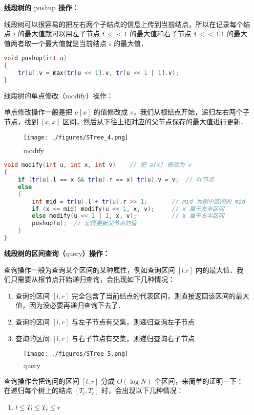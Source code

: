 \textbf{线段树的 $\text{pushup}$ 操作：}

线段树可以很容易的把左右两个子结点的信息上传到当前结点，所以在记录每个结点 $i$ 的最大值就可以用左子节点 $\mathtt{i<<1}$ 的最大值和右子节点 $\mathtt{i<<1|1}$ 的最大值两者取一个最大值就是当前结点 $i$ 的最大值．

\begin{lstlisting}[language=cpp]
void pushup(int u)
{
    tr[u].v = max(tr[u << 1].v, tr[u << 1 | 1].v);
}
\end{lstlisting}

线段树的单点修改（$\text{modify}$）操作：

单点修改操作一般是把 $a[x]$ 的值修改成 $v$，我们从根结点开始，递归左右两个子节点，找到 $[x, x]$ 区间，然后从下往上把对应的父节点保存的最大值进行更新．

\begin{figure}[ht]
\centering
\texttt{[image: ./figures/STree\_4.png]}
\caption{$\text{modify}$} \label{STree_fig4}
\end{figure}


\begin{lstlisting}[language=cpp]
void modify(int u, int x, int v)    // 把 a[x] 修改为 v
{
    if (tr[u].l == x && tr[u].r == x) tr[u].v = v;  // 叶节点
    else
    {
        int mid = tr[u].l + tr[u].r >> 1;       // mid 为树中区间的 mid
        if (x <= mid) modify(u << 1, x, v);     // x 属于左半区间
        else modify(u << 1 | 1, x, v);          // x 属于右半区间
        pushup(u);  // 记得更新父节点的值
    }
}
\end{lstlisting}

\textbf{线段树的区间查询（$\text{query}$）操作：}

查询操作一般为查询某个区间的某种属性，例如查询区间 $[l. r]$ 内的最大值．我们只需要从根节点开始递归查询，会出现如下几种情况：

\begin{enumerate}
\item 查询的区间 $[l, r]$ 完全包含了当前结点的代表区间，则直接返回该区间的最大值，因为没必要再递归查询下去了．
\item 查询的区间 $[l, r]$ 与左子节点有交集，则递归查询左子节点
\item 查询的区间 $[l, r]$ 与右子节点有交集，则递归查询右子节点
\end{enumerate}

\begin{figure}[ht]
\centering
\texttt{[image: ./figures/STree\_5.png]}
\caption{$\text{query}$} \label{STree_fig5}
\end{figure}

查询操作会把询问的区间 $[l, r]$ 分成 $O(\log N)$ 个区间，来简单的证明一下：
在递归每个树上的结点 $[T_l, T_r]$ 时，会出现以下几种情况：

\begin{enumerate}
\item $l \leq T_l \leq T_r \leq r$
\end{enumerate}